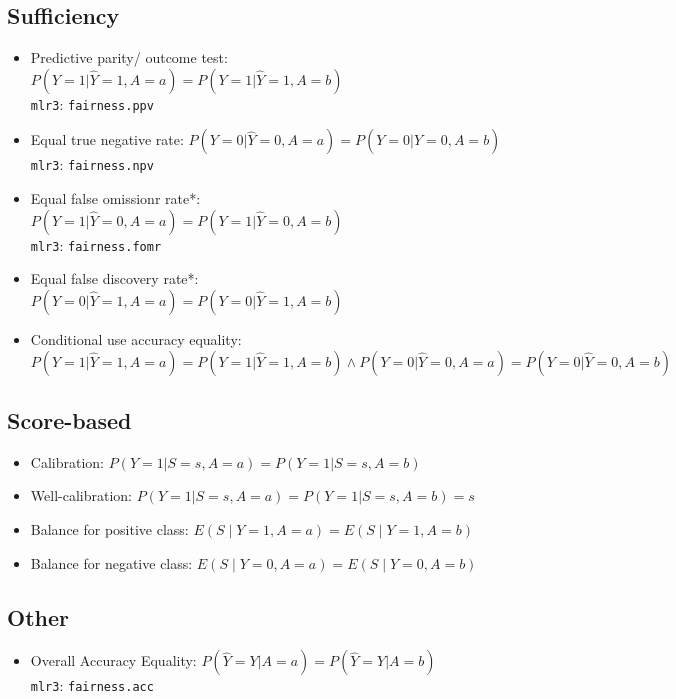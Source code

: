 \documentclass[11pt,a4paper]{article}
\begin{document}
\subsection*{Sufficiency}
\begin{itemize}[leftmargin=2em]
    \item Predictive parity/ outcome test: $P(Y = 1 | \hat{Y} = 1, A = a) = P(Y = 1 | \hat{Y} = 1, A = b)$ \\ \texttt{mlr3}: \texttt{fairness.ppv}
    \item Equal true negative rate: $P(Y = 0 | \hat{Y} = 0, A = a) = P(Y = 0 | \hat{Y} = 0, A = b)$ \\ \texttt{mlr3}: \texttt{fairness.npv}
    \item Equal false omissionr rate*: $P(Y = 1 | \hat{Y} = 0, A = a) = P(Y = 1 | \hat{Y} = 0, A = b)$ \\ \texttt{mlr3}: \texttt{fairness.fomr}
    \item Equal false discovery rate*: $P(Y = 0 | \hat{Y} = 1, A = a) = P(Y = 0 | \hat{Y} = 1, A = b)$ 
    \item Conditional use accuracy equality: $P(Y = 1 | \hat{Y} = 1, A = a) = P(Y = 1 | \hat{Y} = 1, A = b) \land P(Y = 0 | \hat{Y} = 0, A = a) = P(Y = 0 | \hat{Y} = 0, A = b)$
\end{itemize}

\subsection*{Score-based}
\begin{itemize}
    \item Calibration: $P(Y = 1 | S = s, A = a) = P(Y = 1 | S = s, A = b)$
    \item Well-calibration: $P(Y = 1 | S = s, A = a) = P(Y = 1 | S = s, A = b) = s$
    \item Balance for positive class: $E(S \mid Y = 1, A = a) = E(S \mid Y = 1, A = b)$
    \item Balance for negative class: $E(S \mid Y = 0, A = a) = E(S \mid Y = 0, A = b)$
\end{itemize}
\subsection*{Other}
\begin{itemize}
    \item Overall Accuracy Equality: $P(\hat{Y} = Y | A = a) = P(\hat{Y} = Y | A = b)$ \\ \texttt{mlr3}: \texttt{fairness.acc}
\end{itemize}
\end{document}
